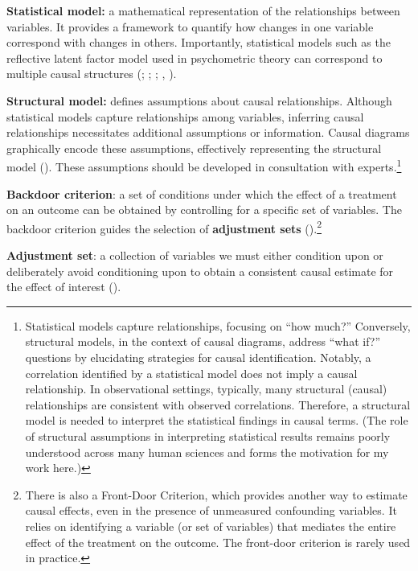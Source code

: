 \documentclass[
  singlecolumn,
  9pt]{article}
\begin{document}
\textbf{Statistical model:} a mathematical representation of the
relationships between variables. It provides a framework to quantify how
changes in one variable correspond with changes in others. Importantly,
statistical models such as the reflective latent factor model used in
psychometric theory can correspond to multiple causal structures
(;
;
;
,
).

\textbf{Structural model:} defines assumptions about causal
relationships. Although statistical models capture relationships among
variables, inferring causal relationships necessitates additional
assumptions or information. Causal diagrams graphically encode these
assumptions, effectively representing the structural model
(). These assumptions
should be developed in consultation with experts.\footnote{Statistical
  models capture relationships, focusing on ``how much?'' Conversely,
  structural models, in the context of causal diagrams, address ``what
  if?'' questions by elucidating strategies for causal identification.
  Notably, a correlation identified by a statistical model does not
  imply a causal relationship. In observational settings, typically,
  many structural (causal) relationships are consistent with observed
  correlations. Therefore, a structural model is needed to interpret the
  statistical findings in causal terms. (The role of structural
  assumptions in interpreting statistical results remains poorly
  understood across many human sciences and forms the motivation for my
  work here.)}

\textbf{Backdoor criterion}: a set of conditions under which the effect
of a treatment on an outcome can be obtained by controlling for a
specific set of variables. The backdoor criterion guides the selection
of \textbf{adjustment sets} ().\footnote{There is also a Front-Door Criterion, which provides
  another way to estimate causal effects, even in the presence of
  unmeasured confounding variables. It relies on identifying a variable
  (or set of variables) that mediates the entire effect of the treatment
  on the outcome. The front-door criterion is rarely used in practice.}

\textbf{Adjustment set}: a collection of variables we must either
condition upon or deliberately avoid conditioning upon to obtain a
consistent causal estimate for the effect of interest
().
\end{document}
